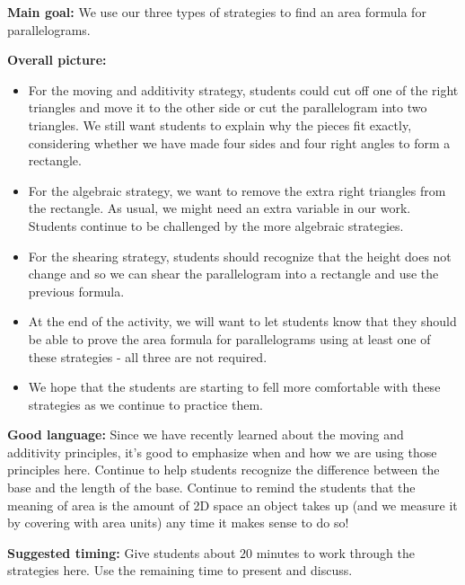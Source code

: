 \documentclass[nooutcomes,noauthor, handout]{ximera}
\begin{document}
\newpage

\begin{instructorNotes} 

{\bf Main goal:} We use our three types of strategies to find an area formula for parallelograms.

{\bf Overall picture:} 
\begin{itemize}
	\item For the moving and additivity strategy, students could cut off one of the right triangles and move it to the other side or cut the parallelogram into two triangles. We still want students to explain why the pieces fit exactly, considering whether we have made four sides and four right angles to form a rectangle.
	\item For the algebraic strategy, we want to remove the extra right triangles from the rectangle. As usual, we might need an extra variable in our work. Students continue to be challenged by the more algebraic strategies.
	\item For the shearing strategy, students should recognize that the height does not change and so we can shear the parallelogram into a rectangle and use the previous formula. 
	\item At the end of the activity, we will want to let students know that they should be able to prove the area formula for parallelograms using at least one of these strategies - all three are not required.
	\item We hope that the students are starting to fell more comfortable with these strategies as we continue to practice them.
\end{itemize}


{\bf Good language:} Since we have recently learned about the moving and additivity principles, it's good to emphasize when and how we are using those principles here. Continue to help students recognize the difference between the base and the length of the base. Continue to remind the students that the meaning of area is the amount of 2D space an object takes up (and we measure it by covering with area units) any time it makes sense to do so!



{\bf Suggested timing:} Give students about $20$ minutes to work through the strategies here. Use the remaining time to present and discuss.



\end{instructorNotes}
\end{document}
